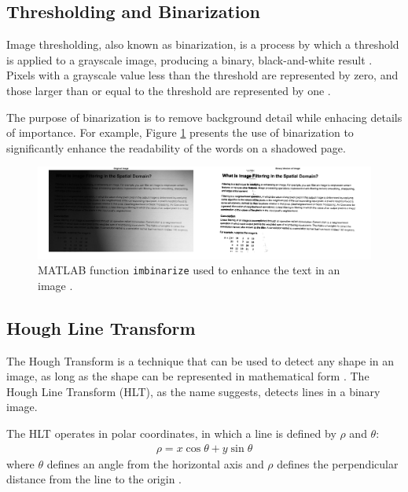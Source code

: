 \newpage
\subsection{Thresholding and Binarization}

Image thresholding, also known as binarization, is a process by which a threshold is applied to a grayscale image, producing a binary, black-and-white result \cite{mathworks_2023b}. Pixels with a grayscale value less than the threshold are represented by zero, and those larger than or equal to the threshold are represented by one \cite{opencv_2023b}.

The purpose of binarization is to remove background detail while enhacing details of importance. For example, Figure \ref{fig:imbinarize} presents the use of binarization to significantly enhance the readability of the words on a shadowed page.

\begin{figure}[ht]
  \centering
  \includegraphics[width=\textwidth]{images/imbinarize_result.png}
  \caption{MATLAB function \texttt{imbinarize} used to enhance the text in an image \cite{mathworks_2023b}.}
  \label{fig:imbinarize}
\end{figure}

\newpage
\subsection{Hough Line Transform}

The Hough Transform is a technique that can be used to detect any shape in an image, as long as the shape can be represented in mathematical form \cite{opencv_2023c}. The Hough Line Transform (HLT), as the name suggests, detects lines in a binary image.

The HLT operates in polar coordinates, in which a line is defined by $\rho$ and $\theta$:
\begin{align}
  \rho = x \cos\theta + y \sin\theta
\end{align}
where $\theta$ defines an angle from the horizontal axis and $\rho$ defines the perpendicular distance from the line to the origin \cite{opencv_2023c}.

